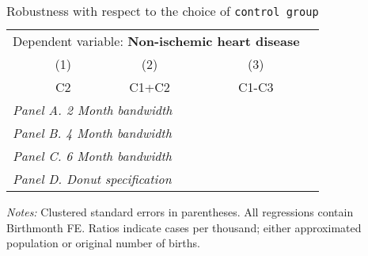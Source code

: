  \begin{table}[H] \begin{threeparttable} \centering \caption{Robustness with respect to the choice of \texttt{control group}} {\def\sym#1{\ifmmode^{#1}\else\(^{#1}\)\fi} \begin{tabular}{l*{4}{c}} \toprule \multicolumn{4}{c}{Dependent variable: \textbf{Non-ischemic heart disease}} \\ \cmidrule(lr){2-4}
            &\multicolumn{1}{c}{(1)}&\multicolumn{1}{c}{(2)}&\multicolumn{1}{c}{(3)}\\
            &\multicolumn{1}{c}{C2}&\multicolumn{1}{c}{C1+C2}&\multicolumn{1}{c}{C1-C3}\\
\midrule
 \multicolumn{4}{l}{\emph{Panel A. 2 Month bandwidth}} \\    \midrule\multicolumn{4}{l}{\emph{Panel B. 4 Month bandwidth}} \\    \midrule\multicolumn{4}{l}{\emph{Panel C. 6 Month bandwidth}} \\    \midrule\multicolumn{4}{l}{\emph{Panel D. Donut specification}} \\    
\bottomrule \end{tabular} } \begin{tablenotes} \item \scriptsize \emph{Notes:} Clustered standard errors in parentheses. All regressions contain Birthmonth FE. Ratios indicate cases per thousand; either approximated population or original number of births. \end{tablenotes} \end{threeparttable} \end{table} 
